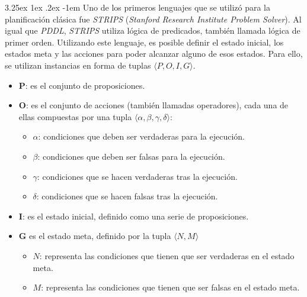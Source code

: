 \documentclass{article}
\makeatletter
\newcounter{subsubsubsection}
\renewcommand\paragraph{\@startsection{paragraph}{5}{\z@}%
      {3.25ex \@plus1ex \@minus.2ex}%
      {-1em}%
      {\normalfont\normalsize\bfseries}}
\makeatother
\begin{document}
    \paragraph{}            
    Uno de los primeros lenguajes que se utilizó para la planificación clásica fue \textit{STRIPS} (\textit{Stanford Research Institute Problem Solver})\cite{strips}. Al igual que \textit{PDDL}, \textit{STRIPS} utiliza lógica de predicados, también llamada lógica de primer orden. Utilizando este lenguaje, es posible definir el estado inicial, los estados meta y las acciones para poder alcanzar alguno de esos estados. Para ello, se utilizan instancias en forma de tuplas $\langle P, O, I, G \rangle$.
    \begin{itemize}
        \item \textbf{P}: es el conjunto de proposiciones.
        \item \textbf{O}: es el conjunto de acciones (también llamadas operadores), cada una de ellas compuestas por una tupla $\langle \alpha, \beta, \gamma, \delta \rangle$:
        \begin{itemize}
            \item \textbf{$\alpha$}: condiciones que deben ser verdaderas para la ejecución.
            \item \textbf{$\beta$}: condiciones que deben ser falsas para la ejecución.
            \item \textbf{$\gamma$}: condiciones que se hacen verdaderas tras la ejecución.
            \item \textbf{$\delta$}: condiciones que se hacen falsas tras la ejecución.
        \end{itemize}
        \item \textbf{I}: es el estado inicial, definido como una serie de proposiciones.
        \item \textbf{G} es el estado meta, definido por la tupla $\langle N, M \rangle$
        \begin{itemize}
            \item \textbf{$N$}: representa las condiciones que tienen que ser verdaderas en el estado meta.
            \item \textbf{$M$}: representa las condiciones que tienen que ser falsas en el estado meta.
        \end{itemize}
    \end{itemize}
    
    
    
    
\end{document}
